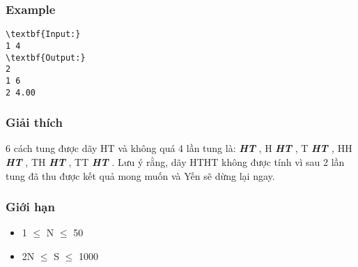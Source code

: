 \subsubsection{Example}
\begin{verbatim}
\textbf{Input:}
1 4
\textbf{Output:}
2
1 6
2 4.00\end{verbatim}

\subsubsection{Giải thích}

6 cách tung được dãy HT và không quá 4 lần tung là: \textbf{\emph{ HT }} , H \textbf{\emph{ HT }} , T \emph{\textbf{ HT } , } HH \textbf{\emph{ HT }} , TH \textbf{\emph{ HT }} , TT \emph{\textbf{ HT }} . Lưu ý rằng, dãy HTHT không được tính vì sau 2 lần tung đã thu được kết quả mong muốn và Yến sẽ dừng lại ngay.

\subsubsection{Giới hạn}
\begin{itemize}
	\item 1  $\le$  N  $\le$  50
	\item 2N  $\le$  S  $\le$  1000
\end{itemize}

\subsubsection{ }
